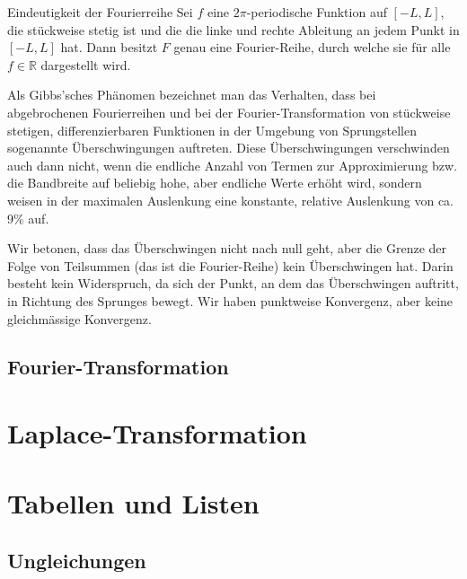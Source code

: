\documentclass[a4paper,10pt]{article}
\begin{document}
\begin{subbox}{Eindeutigkeit der Fourierreihe}
  Sei \(f\) eine \(2\pi\)-periodische Funktion auf \([-L,L]\), die stückweise stetig ist und die die linke und rechte Ableitung an jedem Punkt in \([-L,L]\) hat. Dann besitzt \(F\) genau eine Fourier-Reihe, durch welche sie für alle \(f\in\mathbb{R}\) dargestellt wird.
\end{subbox}

Als Gibbs'sches Phänomen bezeichnet man das Verhalten, dass bei abgebrochenen Fourierreihen und bei der Fourier-Transformation von stückweise stetigen, differenzierbaren Funktionen in der Umgebung von Sprungstellen sogenannte Überschwingungen auftreten. Diese Überschwingungen verschwinden auch dann nicht, wenn die endliche Anzahl von Termen zur Approximierung bzw. die Bandbreite auf beliebig hohe, aber endliche Werte erhöht wird, sondern weisen in der maximalen Auslenkung eine konstante, relative Auslenkung von ca. 9\% auf.

Wir betonen, dass das Überschwingen nicht nach null geht, aber die Grenze der Folge von Teilsummen (das ist die Fourier-Reihe) kein Überschwingen hat. Darin besteht kein Widerspruch, da sich der Punkt, an dem das Überschwingen auftritt, in Richtung des Sprunges bewegt. Wir haben punktweise Konvergenz, aber keine gleichmässige Konvergenz.

\subsection{Fourier-Transformation}



\section{Laplace-Transformation}

\section{Tabellen und Listen}

\subsection{Ungleichungen}
\end{document}

